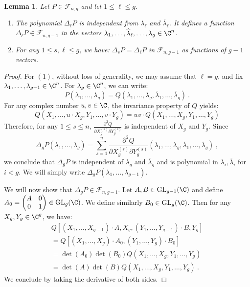 \documentclass[11pt,letterpaper,english]{amsart}
\numberwithin{equation}{subsection}
\numberwithin{equation}{section}
\newcommand\cF{{\mathcal F}}
\theoremstyle{plain}
\newtheorem{lemma}[theorem]{Lemma}
\theoremstyle{remark}
\begin{document}
\begin{lemma}\label{l:laplacian}
   Let $P\in\cF_{n,g}$ and let $1\leq \ell\leq g$.
   \begin{enumerate}
       \item  The polynomial $\Delta_\ell P$ is independent from $\lambda_\ell $ and $\overline{\lambda}_\ell$. It defines a function $\Delta_\ell P\in\cF_{n,g-1}$ in the vectors $\lambda_1,\ldots,\widehat{\lambda}_\ell,\ldots, \lambda_g\in\C^n$.
       \item For any $1\leq s, \ell\leq g$, we have:
      $\Delta_s P=\Delta_\ell P$ in $\cF_{n,g-1}$ as functions of $g-1$ vectors.
   \end{enumerate}
\end{lemma}
\begin{proof}
 For $(1)$, without loss of generality, we may assume that $\ell=g$, and fix $\lambda_1,\ldots,\lambda_{g-1}\in\C^n$.  For $\lambda_g
\in \C^n$, we can write: 
 \[P(\lambda_1,\ldots,\lambda_g)=Q(\lambda_1,\ldots,\lambda_g,\overline{\lambda}_1,\ldots,\overline{\lambda}_g)~.\]
 For any complex number $u,v\in \C$, the invariance property of $Q$ yields:
 \[Q(X_1,\ldots,u\cdot X_g,Y_1,\ldots,v\cdot Y_g)=uv\cdot Q(X_1,\ldots,X_g,Y_1,\ldots,Y_g)\]
Therefore, for any $1\leq s \leq n$, $\frac{\partial^2 Q}{\partial X_g^{(s)}\partial Y_g^{(s)} }$ is independent of $X_g$ and $Y_g$. Since   
\[\Delta_gP(\lambda_1,\ldots,\lambda_g)=\sum_{s=1}^n\frac{\partial^2 Q}{\partial X_g^{(s)}\partial Y_g^{(s)} }(\lambda_1,\ldots,\lambda_g,\overline{\lambda}_1,\ldots,\overline{\lambda}_g)~,\]
 we conclude that $\Delta_gP$ is independent of $\lambda _g$ and $\overline{\lambda}_g$ and is polynomial in $\lambda_i,\overline{\lambda}_i$ for $i<g$. We will simply write $\Delta_gP(\lambda_1,\ldots,\lambda_{g-1})$.
 \medskip
  
We will now show that $\Delta_g P\in \cF_{n,g-1}$. Let $A,B\in\mathrm{GL}_{g-1}(\C) $ and define $A_0=\begin{pmatrix}
    A&0\\0&1
\end{pmatrix}\in \mathrm{GL}_g(\C)$. We define similarly $B_0\in \mathrm{GL}_g(\C)$.
Then for any $X_g,Y_g \in\C^g$, we have:
\begin{multline*}
        Q\left[(X_1,\ldots,X_{g-1})\cdot A,X_g,(Y_1,\ldots,Y_{g-1})\cdot B,Y_g\right]\\=Q\left[(X_1,\ldots,X_g)\cdot A_0,(Y_1,\ldots,Y_g)\cdot B_0\right]~\\
    =\det(A_0)\det(B_0)Q(X_1,\ldots,X_g,Y_1,\ldots,Y_g)\\
    =\det(A)\det(B)Q(X_1,\ldots,X_g,Y_1,\ldots,Y_g)~.
\end{multline*}
We conclude by taking the derivative of both sides. 
\medskip


\end{proof}
\end{document}
